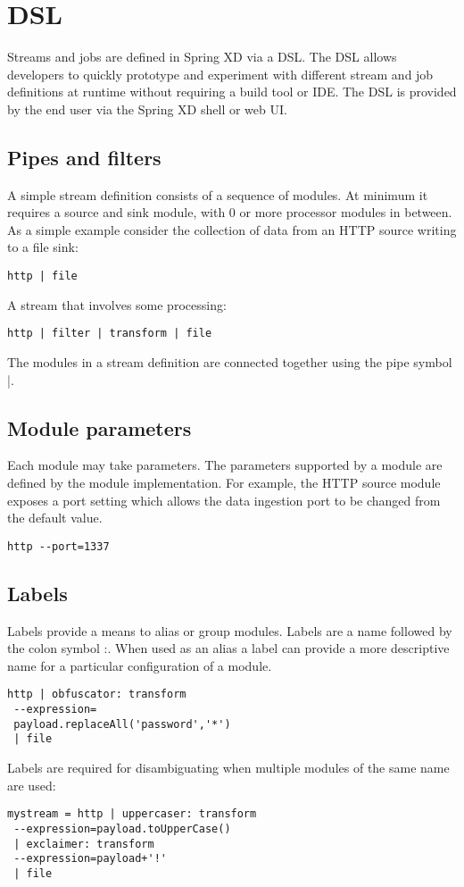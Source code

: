 \section{DSL}
\label{sec:DSL}
Streams and jobs are defined in Spring XD via a DSL\cite{dsl}. The DSL allows developers
to quickly prototype and experiment with different stream and job definitions at
runtime without requiring a build tool or IDE. The DSL is provided by the end user
via the Spring XD shell or web UI.

\subsection {Pipes and filters}
A simple stream definition consists of a sequence of modules. At minimum it requires a
source and sink module, with 0 or more processor modules in between. As a simple example
consider the collection of data from an HTTP source writing to a file sink:

\begin{lstlisting}
http | file
\end{lstlisting}

A stream that involves some processing:

\begin{lstlisting}
http | filter | transform | file
\end{lstlisting}

The modules in a stream definition are connected together using the pipe symbol |.

\subsection{Module parameters}
Each module may take parameters. The parameters supported by a module are defined by
the module implementation. For example, the HTTP source module exposes a port setting
which allows the data ingestion port to be changed from the default value.

\begin{lstlisting}
http --port=1337
\end{lstlisting}

\subsection{Labels}

Labels provide a means to alias or group modules. Labels are a name followed
by the colon symbol :. When used as an alias a label can provide a more descriptive
name for a particular configuration of a module.

\begin{lstlisting}
http | obfuscator: transform
 --expression=
 payload.replaceAll('password','*')
 | file
\end{lstlisting}

Labels are required for disambiguating when multiple modules of the same name are used:

\begin{lstlisting}
mystream = http | uppercaser: transform
 --expression=payload.toUpperCase()
 | exclaimer: transform 
 --expression=payload+'!'
 | file
\end{lstlisting}

